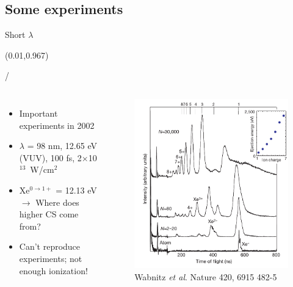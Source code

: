 \documentclass{beamer}
\makeatletter
\newcommand{\framenumber}{
\begin{textblock}{0}(0.01,0.967)
\begin{scriptsize}
{\color{gray}\insertframenumber/\inserttotalframenumber}
\end{scriptsize}
\end{textblock}
}
\makeatother
\begin{document}
\subsection{Some experiments}
\begin{frame}{Short $\lambda$}\framenumber
	\begin{columns}
			\begin{itemize}
			\item Important experiments in 2002
			\item $\lambda$ = 98 nm, 12.65 eV (VUV), 100 fs, 2$\times$10$^{13}$~W/cm$^2$
			\item Xe$^{0\rightarrow1+}$ = 12.13 eV $\rightarrow$ Where does higher CS come from?
			\item Can't reproduce experiments; not enough ionization!
			\end{itemize}
			\begin{figure}
			\includegraphics[width=\textwidth]{figures/Wabnitz2002_fig1}
			\caption{{\tiny Wabnitz \textit{et al}. Nature 420, 6915 482-5}}
			\end{figure}
	\end{columns}
\end{frame}
\end{document}
